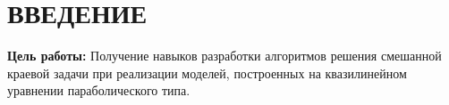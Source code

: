 \chapter*{\hfill{}ВВЕДЕНИЕ\hfill}

\textbf{Цель работы:} Получение навыков разработки алгоритмов решения смешанной краевой задачи при реализации моделей, построенных на квазилинейном уравнении параболического типа.

